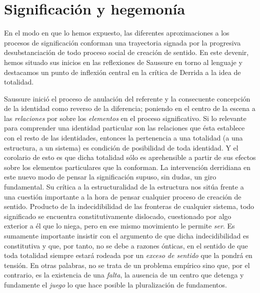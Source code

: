 \documentclass{book}
\begin{document}
\hypertarget{significaciuxf3n-y-hegemonuxeda}{%
\section{Significación y hegemonía}\label{significaciuxf3n-y-hegemonuxeda}}

En el modo en que lo hemos expuesto, las diferentes aproximaciones a los
procesos de significación conforman una trayectoria signada por la
progresiva desubstanciación de todo proceso social de creación de
sentido. En este devenir, hemos situado sus inicios en las reflexiones
de Saussure en torno al lenguaje y destacamos un punto de inflexión
central en la crítica de Derrida a la idea de totalidad.

Saussure inició el proceso de anulación del referente y la consecuente
concepción de la identidad como reverso de la diferencia; poniendo en el
centro de la escena a las \emph{relaciones} por sobre los
\emph{elementos} en el proceso significativo. Si lo relevante para
comprender una identidad particular son las relaciones que ésta
establece con el resto de las identidades, entonces la pertenencia a una
totalidad (a una estructura, a un sistema) es condición de posibilidad
de toda identidad. Y el corolario de esto es que dicha totalidad sólo es
aprehensible a partir de sus efectos sobre los elementos particulares
que la conforman. La intervención derridiana en este nuevo modo de
pensar la significación supuso, sin dudas, un giro fundamental. Su
crítica a la estructuralidad de la estructura nos sitúa frente a una
cuestión importante a la hora de pensar cualquier proceso de creación de
sentido. Producto de la indecidibilidad de las fronteras de cualquier
sistema, todo significado se encuentra constitutivamente dislocado,
cuestionado por algo exterior a él que lo niega, pero en ese mismo
movimiento le permite \emph{ser}. Es sumamente importante insistir con
el argumento de que dicha indecidibilidad es constitutiva y que, por
tanto, no se debe a razones ónticas, en el sentido de que toda totalidad
siempre estará rodeada por un \emph{exceso de sentido} que la pondrá en
tensión. En otras palabras, no se trata de un problema empírico sino
que, por el contrario, es la existencia de una \emph{falta}, la ausencia
de un centro que detenga y fundamente el \emph{juego} lo que hace
posible la pluralización de fundamentos.
\end{document}
